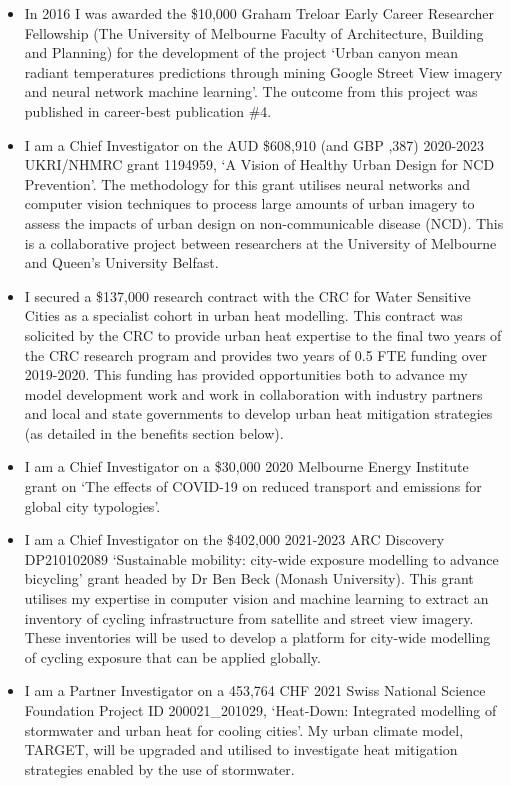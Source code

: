 \begin{itemize}
\item In 2016 I was awarded the \$10,000 Graham Treloar Early Career Researcher Fellowship (The University of Melbourne Faculty of Architecture, Building and Planning) for the development of the project `Urban canyon mean radiant temperatures predictions through mining Google Street View imagery and neural network machine learning'. The outcome from this project was published in career-best publication \#4.

\item I am a Chief Investigator on the AUD \$608,910 (and GBP ,387) 2020-2023 UKRI/NHMRC grant 1194959, `A Vision of Healthy Urban Design for NCD Prevention'. The methodology for this grant utilises neural networks and computer vision techniques to process large amounts of urban imagery to assess the impacts of urban design on non-communicable disease (NCD). This is a collaborative project between researchers at the University of Melbourne and Queen's University Belfast.

\item I secured a \$137,000 research contract with the CRC for Water Sensitive Cities as a specialist cohort in urban heat modelling. This contract was solicited by the CRC to provide urban heat expertise to the final two years of the CRC research program and provides two years of 0.5 FTE funding over 2019-2020. This funding has provided opportunities both to advance my model development work and work in collaboration with industry partners and local and state governments to develop urban heat mitigation strategies (as detailed in the benefits section below).

\item I am a Chief Investigator on a \$30,000 2020 Melbourne Energy Institute grant on `The effects of COVID-19 on reduced transport and emissions for global city typologies'. 

\item I am a Chief Investigator on the \$402,000 2021-2023 ARC Discovery DP210102089 `Sustainable mobility: city-wide exposure modelling to advance bicycling' grant headed by Dr Ben Beck (Monash University). This grant utilises my expertise in computer vision and machine learning to extract an inventory of cycling infrastructure from satellite and street view imagery. These inventories will be used to develop a platform for city-wide modelling of cycling exposure that can be applied globally.

\item I am a Partner Investigator on a 453,764 CHF 2021 Swiss National Science Foundation Project ID 200021\_201029, `Heat-Down: Integrated modelling of stormwater and urban heat for cooling cities'. My urban climate model, TARGET, will be upgraded and utilised to investigate heat mitigation strategies enabled by the use of stormwater.

\end{itemize}




